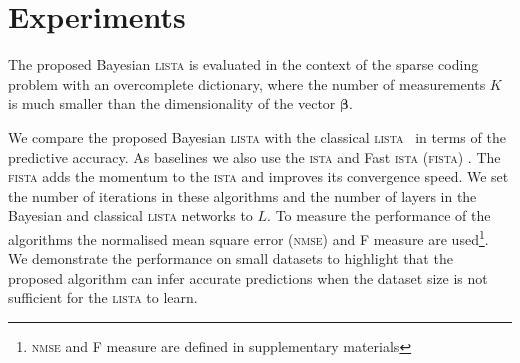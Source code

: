 \documentclass{article}
\begin{document}
\section{Experiments}
\label{sec:experiments}
The proposed Bayesian \textsc{lista} is evaluated in the context of the sparse coding problem with an overcomplete dictionary, where the number of measurements $K$ is much smaller than the dimensionality of the vector $\boldsymbol\beta$.

We compare the proposed Bayesian \textsc{lista} with the classical \textsc{lista}~\cite{gregor2010learning} in terms of the predictive accuracy. As baselines we also use the \textsc{ista} \cite{daubechies2004iterative} and Fast \textsc{ista} (\textsc{fista}) \cite{beck2009fast}. The \textsc{fista} adds the momentum to the \textsc{ista} and improves its convergence speed. We set the number of iterations in these algorithms and the number of layers in the Bayesian and classical \textsc{lista} networks to $L$. To measure the performance of the algorithms the normalised mean square error (\textsc{nmse}) and F measure are used\footnote{\textsc{nmse} and F measure are defined in supplementary materials}. We demonstrate the performance on small datasets to highlight that the proposed algorithm can infer accurate predictions when the dataset size is not sufficient for the \textsc{lista} to learn.
\end{document}
